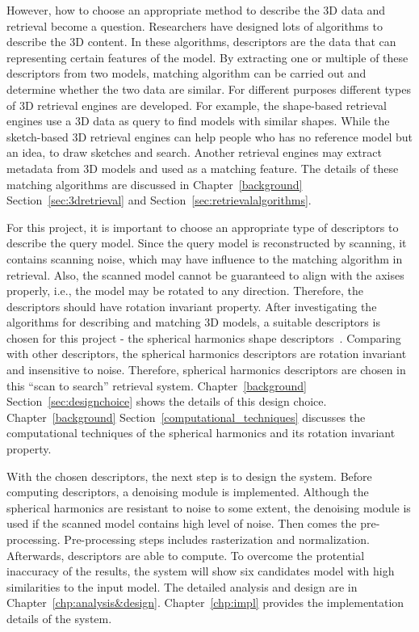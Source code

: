 However, how to choose an appropriate method to describe the 3D data and retrieval become a question. Researchers have designed lots of algorithms to describe the 3D content. In these algorithms, descriptors are the data that can representing certain features of the model. By extracting one or multiple of these descriptors from two models, matching algorithm can be carried out and determine whether the two data are similar. For different purposes different types of 3D retrieval engines are developed. For example, the shape-based retrieval engines use a 3D data as query to find models with similar shapes. While the sketch-based 3D retrieval engines can help people who has no reference model but an idea, to draw sketches and search. Another retrieval engines may extract metadata from 3D models and used as a matching feature. The details of these matching algorithms are discussed in Chapter~\ref{background} Section~\ref{sec:3dretrieval} and Section~\ref{sec:retrievalalgorithms}. 

For this project, it is important to choose an appropriate type of descriptors to describe the query model. Since the query model is reconstructed by scanning, it contains scanning noise, which may have influence to the matching algorithm in retrieval. Also, the scanned model cannot be guaranteed to align with the axises properly, i.e., the model may be rotated to any direction. Therefore, the descriptors should have rotation invariant property. After investigating the algorithms for describing and matching 3D models, a suitable descriptors is chosen for this project - the spherical harmonics shape descriptors~\cite{kazhdan2003rotation}. Comparing with other descriptors, the spherical harmonics descriptors are rotation invariant and insensitive to noise. Therefore, spherical harmonics descriptors are chosen in this ``scan to search'' retrieval system. Chapter~\ref{background} Section~\ref{sec:designchoice} shows the details of this design choice. Chapter~\ref{background} Section~\ref{computational_techniques} discusses the computational techniques of the spherical harmonics and its rotation invariant property. 

With the chosen descriptors, the next step is to design the system. Before computing descriptors, a denoising module is implemented. Although the spherical harmonics are resistant to noise to some extent, the denoising module is used if the scanned model contains high level of noise. Then comes the pre-processing. Pre-processing steps includes rasterization and normalization. Afterwards, descriptors are able to compute. To overcome the protential inaccuracy of the results, the system will show six candidates model with high similarities to the input model. The detailed analysis and design are in Chapter~\ref{chp:analysis&design}. Chapter~\ref{chp:impl} provides the implementation details of the system. 

